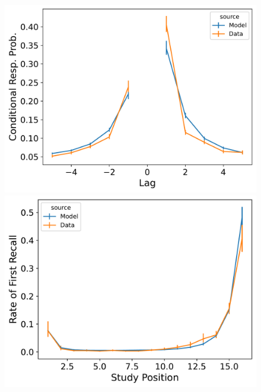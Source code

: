 \documentclass[
  letterpaper,
  11pt,
  english,
  singlespacing,
  headsepline]{MastersDoctoralThesis}
\begin{document}
\begin{figure}
\begin{minipage}{0.33\linewidth}
\includegraphics{icmr_figures/HealyKahana2014_TraceScalingCMR_Model_Fitting_crp-1.png}\end{minipage}%
%
\begin{minipage}{0.33\linewidth}
\includegraphics{icmr_figures/HealyKahana2014_TraceScalingCMR_Model_Fitting_pfr-1.png}\end{minipage}%
%
\begin{minipage}{0.33\linewidth}

\end{minipage}
\end{figure}
\end{document}
